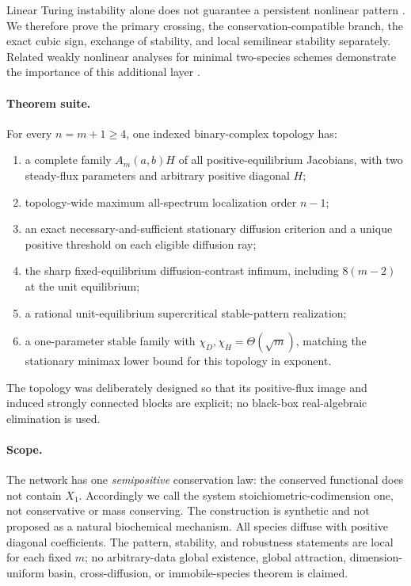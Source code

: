 \documentclass[11pt]{article}
\theoremstyle{definition}
\newcommand{\1}{\mathbf 1}
\begin{document}
Linear Turing instability alone does not guarantee a persistent nonlinear
pattern \cite{Krause2024}.  We therefore prove the primary crossing, the
conservation-compatible branch, the exact cubic sign, exchange of stability,
and local semilinear stability separately.  Related weakly nonlinear analyses
for minimal two-species schemes demonstrate the importance of this additional
layer \cite{Waters2024,Waters2025}.

\paragraph{Theorem suite.}
For every $n=m+1\ge4$, one indexed binary-complex topology has:
\begin{enumerate}[leftmargin=2em]
\item a complete family $A_m(a,b)H$ of all positive-equilibrium Jacobians,
with two steady-flux parameters and arbitrary positive diagonal $H$;
\item topology-wide maximum all-spectrum localization order $n-1$;
\item an exact necessary-and-sufficient stationary diffusion criterion and a
unique positive threshold on each eligible diffusion ray;
\item the sharp fixed-equilibrium diffusion-contrast infimum, including
$8(m-2)$ at the unit equilibrium;
\item a rational unit-equilibrium supercritical stable-pattern realization;
\item a one-parameter stable family with
$\chi_D,\chi_H=\Theta(\sqrt m)$, matching the stationary minimax lower bound
for this topology in exponent.
\end{enumerate}
The topology was deliberately designed so that its positive-flux image and
induced strongly connected blocks are explicit; no black-box real-algebraic
elimination is used.

\paragraph{Scope.}
The network has one \emph{semipositive} conservation law: the conserved
functional does not contain $X_1$.  Accordingly we call the system
stoichiometric-codimension one, not conservative or mass conserving.  The
construction is synthetic and not proposed as a natural biochemical
mechanism.  All species diffuse with positive diagonal coefficients.  The
pattern, stability, and robustness statements are local for each fixed
$m$; no arbitrary-data global existence, global attraction, dimension-uniform
basin, cross-diffusion, or immobile-species theorem is claimed.
\end{document}
